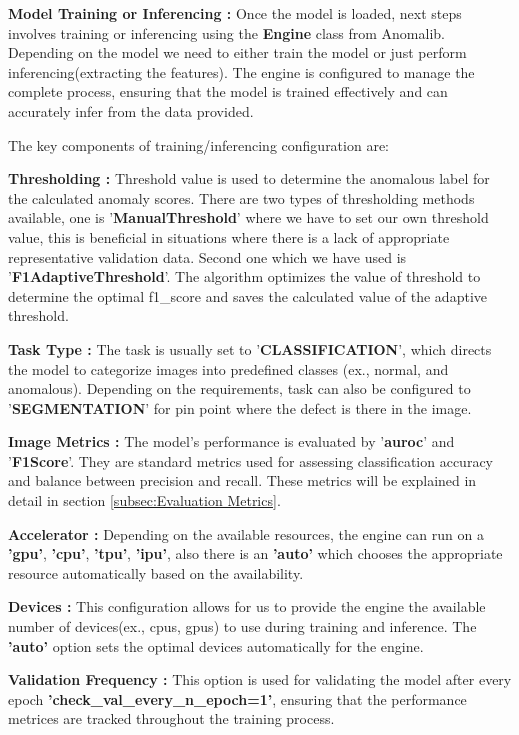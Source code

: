 \textbf{Model Training or Inferencing :} Once the model is loaded, next steps involves training or inferencing using the \textbf{Engine} class from Anomalib. Depending on the model we need to either train the model or just perform inferencing(extracting the features). The engine is configured to manage the complete process, ensuring that the model is trained effectively and can accurately infer from the data provided.

The key components of training/inferencing configuration are:

\textbf{Thresholding :} Threshold value is used to determine the anomalous label for the calculated anomaly scores. There are two types of thresholding methods available, one is '\textbf{ManualThreshold}' where we have to set our own threshold value, this is beneficial in situations where there is a lack of appropriate representative validation data\cite{9897283}. Second one which we have used is '\textbf{F1AdaptiveThreshold}'. The algorithm optimizes the value of threshold to determine the optimal f1\_score and saves the calculated value of the adaptive threshold.\cite{Anomalib2024}

\textbf{Task Type :} The task is usually set to '\textbf{CLASSIFICATION}', which directs the model to categorize images into predefined classes (ex., normal, and anomalous). Depending on the requirements, task can also be configured to '\textbf{SEGMENTATION}' for pin point where the defect is there in the image.

\textbf{Image Metrics :} The model's performance is evaluated by '\textbf{\gls{auroc}}' and '\textbf{F1Score}'. They are standard metrics used for assessing classification accuracy and balance between precision and recall. These metrics will be explained in detail in section \ref{subsec:Evaluation Metrics}.

\textbf{Accelerator :} Depending on the available resources, the engine can run on a \textbf{'\gls{gpu}'}, \textbf{'\gls{cpu}'}, \textbf{'\gls{tpu}'}, \textbf{'\gls{ipu}'}, also there is an \textbf{'auto'} which chooses the appropriate resource automatically based on the availability.

\textbf{Devices :} This configuration allows for us to provide the engine the available number of devices(ex., \glspl{cpu}, \glspl{gpu}) to use during training and inference. The \textbf{'auto'} option sets the optimal devices automatically for the engine.

\textbf{Validation Frequency :} This option is used for validating the model after every epoch \textbf{'check\_val\_every\_n\_epoch=1'}, ensuring that the performance metrices are tracked throughout the training process.

